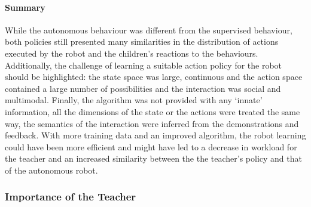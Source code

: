 



\paragraph{Summary}

While the autonomous behaviour was different from the supervised behaviour, both policies still presented many similarities in the distribution of actions executed by the robot and the children's reactions to the behaviours. Additionally, the challenge of learning a suitable action policy for the robot should be highlighted: the state space was large, continuous and the action space contained a large number of possibilities and the interaction was social and multimodal. Finally, the algorithm was not provided with any `innate' information, all the dimensions of the state or the actions were treated the same way, the semantics of the interaction were inferred from the demonstrations and feedback. With more training data and an improved algorithm, the robot learning could have been more efficient and might have led to a decrease in workload for the teacher and an increased similarity between the the teacher's policy and that of the autonomous robot. 

\subsubsection{Importance of the Teacher}

